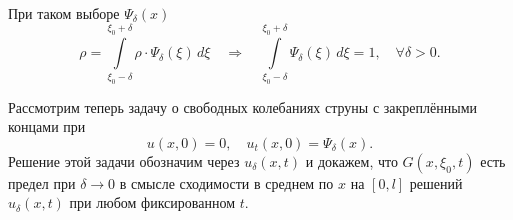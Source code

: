 \noindent При таком выборе $\Psi_{\delta}(x)$
\begin{equation}\label{l12:eq:4.1}
	\rho=\int\limits_{\xi_0-\delta}^{\xi_0+\delta}\rho\cdot\Psi_\delta(\xi)\,d\xi\quad\Longrightarrow\quad\int\limits_{\xi_0-\delta}^{\xi_0+\delta}\Psi_\delta(\xi)\,d\xi=1,\quad\forall\delta>0.
\end{equation}

Рассмотрим теперь задачу о свободных колебаниях струны с закреплёнными концами при
\begin{equation*}
	u(x,0)=0,\quad u_t(x,0)=\Psi_\delta(x).
\end{equation*}
Решение этой задачи обозначим через $u_\delta(x,t)$ и докажем, что $G(x,\xi_0,t)$ есть предел при $\delta\to0$ в смысле сходимости в среднем по $x$ на $[0,l]$ решений $u_\delta(x,t)$ при любом фиксированном $t$.

